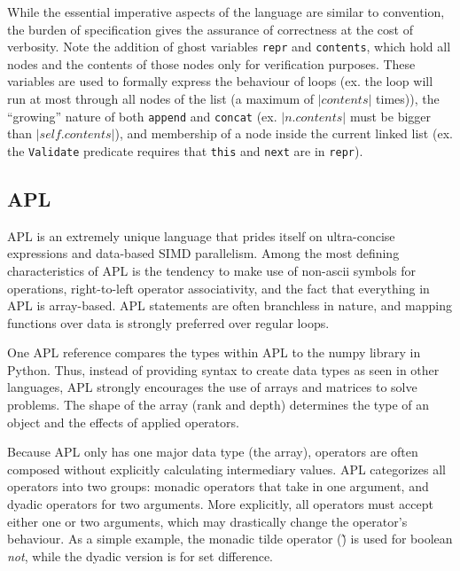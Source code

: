 \documentclass{article}
\begin{document}
While the essential imperative aspects of the language are similar to convention, the burden of specification
gives the assurance of correctness at the cost of verbosity.
Note the addition of ghost variables \texttt{repr} and \texttt{contents}, which hold all nodes and the contents of those
nodes only for verification purposes. These variables are used to formally express the behaviour of
loops (ex. the loop will run at most through all nodes of the list (a maximum of $|contents|$ times)),
the ``growing'' nature of both \texttt{append} and \texttt{concat} (ex. $|n.contents|$ must be bigger than $|self.contents|$),
and membership of a node inside the current linked list
(ex. the \texttt{Validate} predicate requires that \texttt{this} and \texttt{next} are in \texttt{repr}).









\subsection{APL}

APL is an extremely unique language that prides itself on ultra-concise expressions and data-based SIMD parallelism.
Among the most defining characteristics of APL is the tendency to make use of non-ascii symbols for operations,
right-to-left operator associativity, and the fact that everything in APL is array-based. APL statements are often
branchless in nature, and mapping functions over data is strongly preferred over regular loops.

One APL reference \cite{apl} compares the types within APL to the numpy library in Python.
Thus, instead of providing syntax to create data types as seen in other languages,
APL strongly encourages the use of arrays and matrices to solve problems.
The shape of the array (rank and depth) determines the type of an object and the effects of applied operators.

Because APL only has one major data type (the array), operators are often composed without explicitly
calculating intermediary values. APL categorizes all operators into two groups: monadic operators that take
in one argument, and dyadic operators for two arguments. More explicitly, all operators must accept
either one or two arguments, which may drastically change the operator's behaviour.
As a simple example, the monadic tilde operator (\~) is used for boolean \textit{not}, while the dyadic version
is for set difference.
\end{document}
